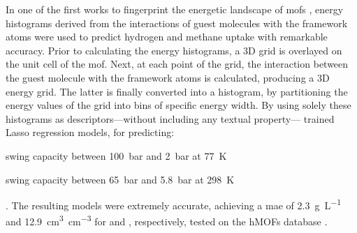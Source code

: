 In one of the first works to fingerprint the energetic landscape of \glspl{mof}
\parencite{bucior}, energy histograms derived from the
interactions of guest molecules with the framework atoms were used to predict
hydrogen and methane uptake with remarkable accuracy. Prior to calculating the
energy histograms, a 3D grid is overlayed on the unit cell of
the \gls{mof}. Next, at each point of the grid, the interaction between the
guest molecule with the framework atoms is calculated, producing a 3D energy
grid. The latter is finally converted into a histogram, by
partitioning the energy values of the grid into bins of specific energy width.
By using solely these histograms as descriptors---without including any textual
property---\textcite{bucior} trained Lasso regression
models, for predicting:
\begin{enumerate*}[label=\roman*).]
	\item {} swing capacity between \SI{100}{\bar}
		and \SI{2}{\bar} at \SI{77}{\kelvin}
	\item {} swing capacity between \SI{65}{\bar}
		and \SI{5.8}{\bar} at \SI{298}{\kelvin}
\end{enumerate*}.
The resulting models were extremely accurate, achieving a \gls{mae} of \SI{2.3}{\gram\per\liter} and
\SI{12.9}{\cubic\centi\meter\per\cubic\centi\meter} for  and ,
respectively, tested on the hMOFs database
\parencite{siegel36}.

